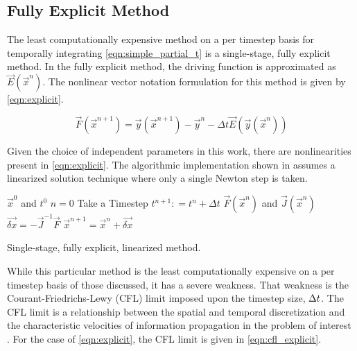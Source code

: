 \subsection{Fully Explicit Method}
\label{subsect:numerics_explicit}
The least computationally expensive method on a per timestep basis for temporally integrating \eqref{eqn:simple_partial_t} is a single-stage, fully explicit method.
In the fully explicit method, the driving function is approximated as $\vec{E}(\vec{x}^n)$.
The nonlinear vector notation formulation for this method is given by \eqref{eqn:explicit}.

\begin{equation}
\label{eqn:explicit}
\vec{F}(\vec{x}^{n+1}) = \vec{y}(\vec{x}^{n+1}) - \vec{y}^{n} - \Delta t \vec{E}(\vec{y}(\vec{x}^{n}))
\end{equation}

Given the choice of independent parameters in this work, there are nonlinearities present in \eqref{eqn:explicit}.
The algorithmic implementation shown in  assumes a linearized solution technique where only a single Newton step is taken.

\begin{algo}[ht!]
\setlength{\baselineskip}{0.625\baselineskip}
\begin{algorithmic}[1]
\Require $\vec{x}^{0}$ and $t^{0}$
\Set $n = 0$
\Loop \; Take a Timestep
    \State $t^{n+1} : = t^{n} + \Delta t$
    \Calculate $\vec{F}(\vec{x}^n)$ and $\vec{J}(\vec{x}^n)$
    \Calculate $\vec{\delta x} = -\vec{J}^{-1}\vec{F}$
    \Calculate $\vec{x}^{n+1} = \vec{x}^{n} + \vec{\delta x}$ 
\end{algorithmic}
\caption{Single-stage, fully explicit, linearized method.}
\label{algo:explicit}
\end{algo}

While this particular method is the least computationally expensive on a per timestep basis of those discussed, it has a severe weakness.
That weakness is the Courant-Friedrichs-Lewy (CFL) limit imposed upon the timestep size, $\dt{}$.
The CFL limit is a relationship between the spatial and temporal discretization and the characteristic velocities of information propagation in the problem of interest \cite{LeVeque2007, Tannehill1997}.
For the case of \eqref{eqn:explicit}, the CFL limit is given in \eqref{eqn:cfl_explicit}.

